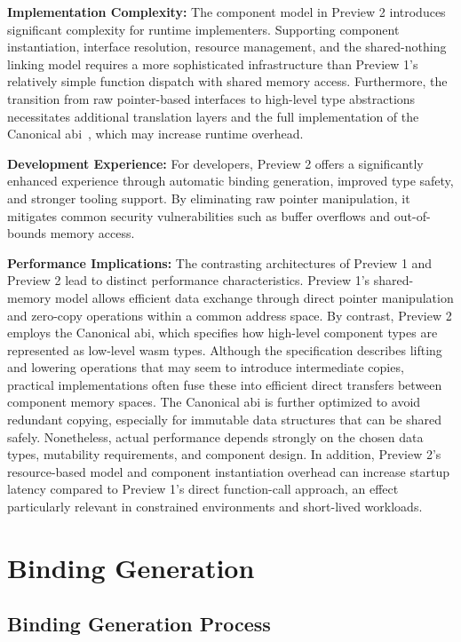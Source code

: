 \textbf{Implementation Complexity:} The component model in Preview 2 introduces significant complexity for runtime implementers. Supporting component instantiation, interface resolution, resource management, and the shared-nothing linking model requires a more sophisticated infrastructure than Preview 1’s relatively simple function dispatch with shared memory access. Furthermore, the transition from raw pointer-based interfaces to high-level type abstractions necessitates additional translation layers and the full implementation of the Canonical \acrfull{abi}~\cite{abi, cabi}, which may increase runtime overhead.

\textbf{Development Experience:} For developers, Preview 2 offers a significantly enhanced experience through automatic binding generation, improved type safety, and stronger tooling support. By eliminating raw pointer manipulation, it mitigates common security vulnerabilities such as buffer overflows and out-of-bounds memory access.

\textbf{Performance Implications:} The contrasting architectures of Preview 1 and Preview 2 lead to distinct performance characteristics. Preview 1’s shared-memory model allows efficient data exchange through direct pointer manipulation and zero-copy operations within a common address space. By contrast, Preview 2 employs the Canonical \acrshort{abi}, which specifies how high-level component types are represented as low-level \acrshort{wasm} types. Although the specification describes lifting and lowering operations that may seem to introduce intermediate copies, practical implementations often fuse these into efficient direct transfers between component memory spaces. The Canonical \acrshort{abi} is further optimized to avoid redundant copying, especially for immutable data structures that can be shared safely. Nonetheless, actual performance depends strongly on the chosen data types, mutability requirements, and component design. In addition, Preview 2’s resource-based model and component instantiation overhead can increase startup latency compared to Preview 1’s direct function-call approach, an effect particularly relevant in constrained environments and short-lived workloads.

\section{Binding Generation}
\label{sec:wit-binding}

\subsection{Binding Generation Process}
\label{subsec:binding-generation}

